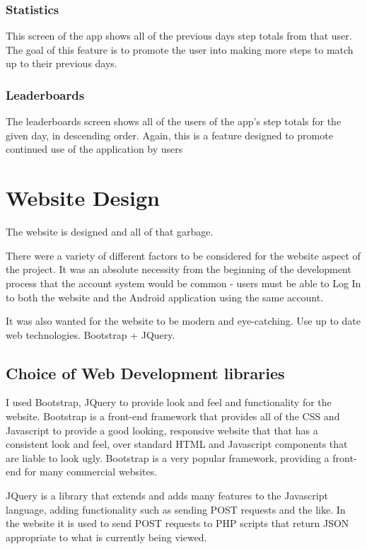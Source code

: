 \documentclass{l4proj}
\begin{document}
\subsubsection{Statistics}

This screen of the app shows all of the previous days step totals from that user. The goal of this feature is to promote the user into making more steps to match up to their previous days.

\subsubsection{Leaderboards}

The leaderboards screen shows all of the users of the app's step totals for the given day, in descending order. Again, this is a feature designed to promote continued use of the application by users 

\section{Website Design}

The website is designed and all of that garbage.

There were a variety of different factors to be considered for the website aspect of the project. It was an absolute necessity from the beginning of the development process that the account system would be common - users must be able to Log In to both the website and the Android application using the same account.

It was also wanted for the website to be modern and eye-catching. Use up to date web technologies. Bootstrap + JQuery.

\subsection{Choice of Web Development libraries}

I used Bootstrap, JQuery to provide look and feel and functionality for the website. Bootstrap is a front-end framework that provides all of the CSS and Javascript to provide a good looking, responsive website that that has a consistent look and feel, over standard HTML and Javascript components that are liable to look ugly. Bootstrap is a very popular framework, providing a front-end for many commercial websites.

JQuery is a library that extends and adds many features to the Javascript language, adding functionality such as sending POST requests and the like. In the website it is used to send POST requests to PHP scripts that return JSON appropriate to what is currently being viewed.
\end{document}
